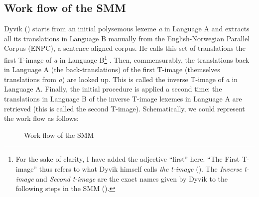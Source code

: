 \subsection{Work flow of the SMM}
\label{sec:3.4.1}
Dyvik (\citep{johansson_translational_1998}) starts from an initial polysemous lexeme \textit{a} in Language A and extracts all its translations in Language B manually from the English-Norwegian Parallel Corpus (ENPC), a sentence-aligned corpus. He calls this set of translations the first T-image of \textit{a} in Language B\footnote{For the sake of clarity, I have added the adjective “first” here. “The First T-image” thus refers to what Dyvik himself calls \textit{the} \textit{t-image} (\citep{johansson_translational_1998}). The \textit{Inverse} \textit{t-image} and \textit{Second} \textit{t-image} are the exact names given by Dyvik to the following steps in the SMM (\citep{johansson_translational_1998}).} . Then, commensurably, the translations back in Language A (the back-translations) of the first T-image (themselves translations from \textit{a}) are looked up. This is called the inverse T-image of \textit{a} in Language A. Finally, the initial procedure is applied a second time: the translations in Language B of the inverse T-image lexemes in Language A are retrieved (this is called the second T-image). Schematically, we could represent the work flow as follows:

\begin{figure}[h]

\caption{\label{fig:3:8}  Work flow of the SMM}
\end{figure}

